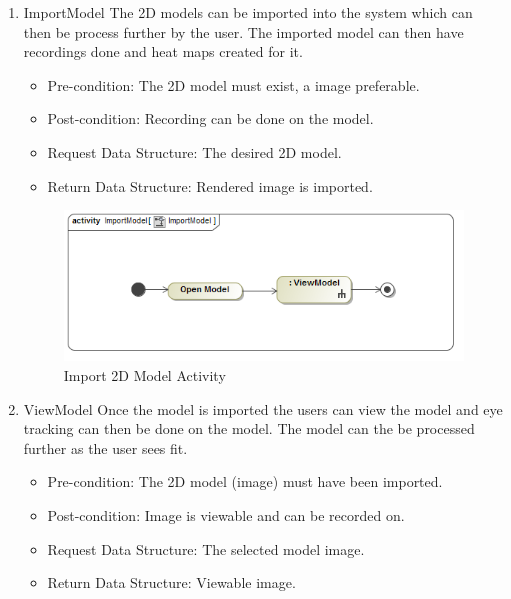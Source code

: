 	\begin{enumerate}
		\item{ImportModel}
		\newline
		The 2D models can be imported into the system which can then be process further by the user. The imported model can then have recordings done and heat maps created for it. 
		\begin{itemize}
			\item Pre-condition: The 2D model must exist, a image preferable.
			\item Post-condition: Recording can be done on the model.
			\item Request Data Structure: The desired 2D model.
			\item Return Data Structure: Rendered image is imported.
		\end{itemize}
		
		\begin{figure}[!ht]
			\centering
			\includegraphics[scale=0.5,width=15cm,keepaspectratio]{Diagrams/Activity_Diagram__ImportModel__ImportModel.png}
			\caption{Import 2D Model Activity}
		\end{figure}
	
		\item{ViewModel}
		Once the model is imported the users can view the model and eye tracking can then be done on the model. The model can the be processed further as the user sees fit.
		\begin{itemize}
			\item Pre-condition: The 2D model (image) must have been imported.
			\item Post-condition: Image is viewable and can be recorded on.
			\item Request Data Structure: The selected model image.
			\item Return Data Structure: Viewable image.
		\end{itemize}
		

\end{enumerate}
